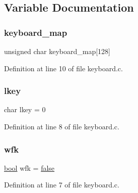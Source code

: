 \subsection{Variable Documentation}
\mbox{\label{a00038_a5d0b5e007d1b57bf84d1c03439810533_a5d0b5e007d1b57bf84d1c03439810533}} 
\subsubsection{\texorpdfstring{keyboard\+\_\+map}{keyboard\_map}}
{\footnotesize\ttfamily unsigned char keyboard\+\_\+map\mbox{[}128\mbox{]}}



Definition at line 10 of file keyboard.\+c.

\mbox{\label{a00038_ade374650022cb30c4f5591a8dafad685_ade374650022cb30c4f5591a8dafad685}} 
\subsubsection{\texorpdfstring{lkey}{lkey}}
{\footnotesize\ttfamily char lkey = 0}



Definition at line 8 of file keyboard.\+c.

\mbox{\label{a00038_a6ddd5223379778858edc46ffbec19775_a6ddd5223379778858edc46ffbec19775}} 
\subsubsection{\texorpdfstring{wfk}{wfk}}
{\footnotesize\ttfamily \hyperlink{a00125_af6a258d8f3ee5206d682d799316314b1_af6a258d8f3ee5206d682d799316314b1}{bool} wfk = \hyperlink{a00125_af6a258d8f3ee5206d682d799316314b1_af6a258d8f3ee5206d682d799316314b1ae9de385ef6fe9bf3360d1038396b884c}{false}}



Definition at line 7 of file keyboard.\+c.

